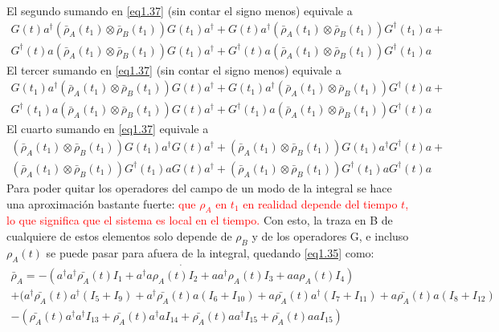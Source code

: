 \documentclass{book}
\begin{document}
 El segundo sumando en \textcolor{blue}{\ref{eq1.37}} (sin contar el signo menos) equivale a
 \begin{equation}\label{eq1.41}\begin{aligned} {G(t)a^\dag(\bar{\rho}_A(t_1)\otimes\bar{\rho}_B(t_1))G(t_1)a^\dag+ G(t)a^\dag(\bar{\rho}_A(t_1)\otimes\bar{\rho}_B(t_1))G^\dag(t_1)a+} \\ {G^\dag(t)a(\bar{\rho}_A(t_1)\otimes\bar{\rho}_B(t_1))G(t_1)a^\dag+ G^\dag(t)a(\bar{\rho}_A(t_1)\otimes\bar{\rho}_B(t_1))G^\dag(t_1)a }\end{aligned}\end{equation}
 El tercer sumando en \textcolor{blue}{\ref{eq1.37}} (sin contar el signo menos) equivale a
 \begin{equation}\label{eq1.42}\begin{aligned} { G(t_1)a^\dag(\bar{\rho}_A(t_1)\otimes\bar{\rho}_B(t_1))G(t)a^\dag+ G(t_1)a^\dag(\bar{\rho}_A(t_1)\otimes\bar{\rho}_B(t_1))G^\dag(t)a+} \\ {G^\dag(t_1)a(\bar{\rho}_A(t_1)\otimes\bar{\rho}_B(t_1))G(t)a^\dag+ G^\dag(t_1)a(\bar{\rho}_A(t_1)\otimes\bar{\rho}_B(t_1))G^\dag(t)a}\end{aligned}\end{equation}
 El cuarto sumando en  \textcolor{blue}{\ref{eq1.37}} equivale a
 \begin{equation}\label{eq1.43}\begin{aligned} {(\bar{\rho}_A(t_1)\otimes\bar{\rho}_B(t_1))G(t_1)a^\dag G(t)a^\dag+(\bar{\rho}_A(t_1)\otimes\bar{\rho}_B(t_1))G(t_1)a^\dag G^\dag(t)a+}\\  { (\bar{\rho}_A(t_1)\otimes\bar{\rho}_B(t_1))G^\dag(t_1)a G(t)a^\dag +(\bar{\rho}_A(t_1)\otimes\bar{\rho}_B(t_1))G^\dag(t_1)a G^\dag(t)a }\end{aligned}\end{equation}
 Para poder quitar los operadores del campo de un modo de la integral se hace una aproximación bastante fuerte: \textcolor{Red}{que $\rho_A$ en $t_1$ en realidad depende del tiempo $t$, lo que significa que el sistema es local en el tiempo.}
 Con esto, la traza en B de cualquiere de estos elementos solo depende de $\rho_B$ y de los operadores G, e incluso $\rho_A(t)$ se puede pasar para afuera de la integral, quedando \textcolor{blue}{\ref{eq1.35}} como:
  \begin{equation}\label{eq1.44}\begin{aligned}\dot{\bar{\rho}_A=-(a^\dag a^\dag \bar{\rho_A}(t)I_1+a^\dag a \rho_A(t) I_2+ aa^\dag \rho_A(t) I_3+aa\rho_A(t) I_4)} \\ {+(a^\dag\bar{\rho_A}(t)a^\dag (I_5+I_9)+a^\dag\bar{\rho_A}(t)a (I_6+I_{10})+ a\bar{\rho_A}(t)a^\dag (I_7+I_{11})+a\bar{\rho_A}(t)a (I_8+I_{12})} \\ {-(\bar{\rho_A}(t)a^\dag a^\dag I_{13}+\bar{\rho_A}(t)a^\dag a I_{14}+ \bar{\rho_A}(t)aa^\dag I_{15}+\bar{\rho_A}(t)aa I_{15})} \end{aligned}\end{equation}
\end{document}
